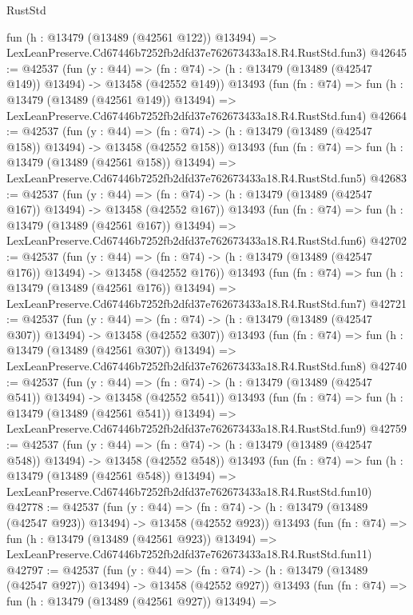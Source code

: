 \begin{lexlean}{RustStd}
\begin{coremodule}
    fun (h : @13479 (@13489 (@42561 @122)) @13494) =>
    LexLeanPreserve.Cd67446b7252fb2dfd37e762673433a18.R4.RustStd.fun3)
@42645 := @42537
    (fun (y : @44) =>
    (fn : @74) -> (h : @13479 (@13489 (@42547 @149)) @13494) -> @13458 (@42552 @149))
    @13493
    (fun (fn : @74) =>
    fun (h : @13479 (@13489 (@42561 @149)) @13494) =>
    LexLeanPreserve.Cd67446b7252fb2dfd37e762673433a18.R4.RustStd.fun4)
@42664 := @42537
    (fun (y : @44) =>
    (fn : @74) -> (h : @13479 (@13489 (@42547 @158)) @13494) -> @13458 (@42552 @158))
    @13493
    (fun (fn : @74) =>
    fun (h : @13479 (@13489 (@42561 @158)) @13494) =>
    LexLeanPreserve.Cd67446b7252fb2dfd37e762673433a18.R4.RustStd.fun5)
@42683 := @42537
    (fun (y : @44) =>
    (fn : @74) -> (h : @13479 (@13489 (@42547 @167)) @13494) -> @13458 (@42552 @167))
    @13493
    (fun (fn : @74) =>
    fun (h : @13479 (@13489 (@42561 @167)) @13494) =>
    LexLeanPreserve.Cd67446b7252fb2dfd37e762673433a18.R4.RustStd.fun6)
@42702 := @42537
    (fun (y : @44) =>
    (fn : @74) -> (h : @13479 (@13489 (@42547 @176)) @13494) -> @13458 (@42552 @176))
    @13493
    (fun (fn : @74) =>
    fun (h : @13479 (@13489 (@42561 @176)) @13494) =>
    LexLeanPreserve.Cd67446b7252fb2dfd37e762673433a18.R4.RustStd.fun7)
@42721 := @42537
    (fun (y : @44) =>
    (fn : @74) -> (h : @13479 (@13489 (@42547 @307)) @13494) -> @13458 (@42552 @307))
    @13493
    (fun (fn : @74) =>
    fun (h : @13479 (@13489 (@42561 @307)) @13494) =>
    LexLeanPreserve.Cd67446b7252fb2dfd37e762673433a18.R4.RustStd.fun8)
@42740 := @42537
    (fun (y : @44) =>
    (fn : @74) -> (h : @13479 (@13489 (@42547 @541)) @13494) -> @13458 (@42552 @541))
    @13493
    (fun (fn : @74) =>
    fun (h : @13479 (@13489 (@42561 @541)) @13494) =>
    LexLeanPreserve.Cd67446b7252fb2dfd37e762673433a18.R4.RustStd.fun9)
@42759 := @42537
    (fun (y : @44) =>
    (fn : @74) -> (h : @13479 (@13489 (@42547 @548)) @13494) -> @13458 (@42552 @548))
    @13493
    (fun (fn : @74) =>
    fun (h : @13479 (@13489 (@42561 @548)) @13494) =>
    LexLeanPreserve.Cd67446b7252fb2dfd37e762673433a18.R4.RustStd.fun10)
@42778 := @42537
    (fun (y : @44) =>
    (fn : @74) -> (h : @13479 (@13489 (@42547 @923)) @13494) -> @13458 (@42552 @923))
    @13493
    (fun (fn : @74) =>
    fun (h : @13479 (@13489 (@42561 @923)) @13494) =>
    LexLeanPreserve.Cd67446b7252fb2dfd37e762673433a18.R4.RustStd.fun11)
@42797 := @42537
    (fun (y : @44) =>
    (fn : @74) -> (h : @13479 (@13489 (@42547 @927)) @13494) -> @13458 (@42552 @927))
    @13493
    (fun (fn : @74) =>
    fun (h : @13479 (@13489 (@42561 @927)) @13494) =>

\end{coremodule}
\end{lexlean}
